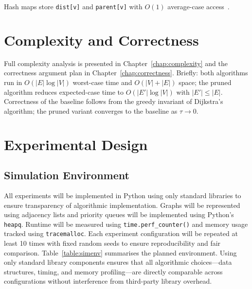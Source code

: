 Hash maps store \texttt{dist[v]} and \texttt{parent[v]} with $O(1)$ average-case access~\citep{cormen2009}.

\section{Complexity and Correctness}

Full complexity analysis is presented in Chapter~\ref{chap:complexity} and the correctness argument plan in Chapter~\ref{chap:correctness}. Briefly: both algorithms run in $O(|E|\log|V|)$ worst-case time and $O(|V|+|E|)$ space; the pruned algorithm reduces expected-case time to $O(|E'|\log|V|)$ with $|E'|\leq|E|$. Correctness of the baseline follows from the greedy invariant of Dijkstra's algorithm; the pruned variant converges to the baseline as $\tau\to 0$.

\section{Experimental Design}
\label{sec:expdesign}

\subsection{Simulation Environment}

All experiments will be implemented in Python using only standard libraries to ensure transparency of algorithmic implementation. Graphs will be represented using adjacency lists and priority queues will be implemented using Python's \texttt{heapq}. Runtime will be measured using \texttt{time.perf\_counter()} and memory usage tracked using \texttt{tracemalloc}. Each experiment configuration will be repeated at least 10 times with fixed random seeds to ensure reproducibility and fair comparison. Table~\ref{table:simenv} summarises the planned environment. Using only standard library components ensures that all algorithmic choices---data structures, timing, and memory profiling---are directly comparable across configurations without interference from third-party library overhead.


